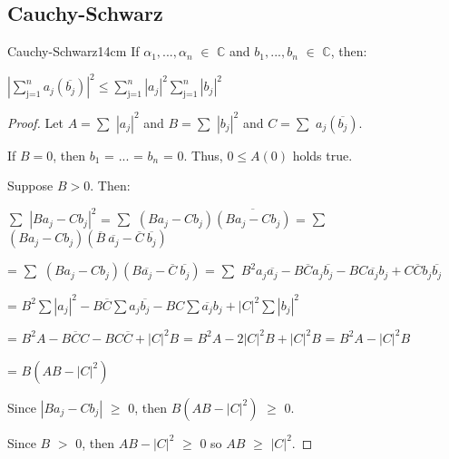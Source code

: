 	\vspace{0.5cm}





\subsection{ Cauchy-Schwarz } 

	\begin{wtheorem}{Cauchy-Schwarz}{14cm}
		If $\alpha_1 , ... , \alpha_n$ $\in$ $\mathbb{C}$ and
		$b_1 , ... , b_n$ $\in$ $\mathbb{C}$, then:

		\hspace{1cm}
		$| \sum_{\text{j=1}}^{n} a_j(\overline{b_j})  |^2 \leq
		\sum_{\text{j=1}}^{n} |a_j|^2 \sum_{\text{j=1}}^{n} |b_j|^2 $
	\end{wtheorem}

	\begin{proof}
		Let $A = \sum$ $|a_j|^2$ and $B = \sum$ $|b_j|^2$ and
		$C = \sum$ $a_j(\overline{b_j})$.

		If $B = 0$, then $b_1$ = ... = $b_n$ = 0. Thus, $0 \leq A(0)$ holds true.

		Suppose $B > 0$. Then:

		\hspace{1cm}
		$\sum$ $|Ba_j - Cb_j|^2$
		= $\sum$ $(Ba_j - Cb_j)\overline{(Ba_j - Cb_j)}$
		= $\sum$ $(Ba_j - Cb_j)(\overline{B} \ \overline{a_j}
		- \overline{C} \ \overline{b_j})$

		\hspace{1cm}
		= $\sum$ $(Ba_j-Cb_j)(B\overline{a_j} - \overline{C} \ \overline{b_j})$
		= $\sum$ $B^2a_j\overline{a_j} - B\overline{C}a_j\overline{b_j}
		- BC\overline{a_j}b_j + C\overline{C}b_j\overline{b_j}$

		\hspace{1cm}
		= $B^2 \sum |a_j|^2 - B\overline{C}\sum a_j\overline{b_j}
		- BC \sum \overline{a_j}b_j+ |C|^2 \sum |b_j|^2$

		\hspace{1cm}
		= $B^2A - B\overline{C}C - BC\overline{C} + |C|^2B$
		= $B^2A - 2|C|^2B + |C|^2B$ = $B^2A -|C|^2B$

		\hspace{1cm}
		= $B(AB - |C|^2)$

		Since $| Ba_j - Cb_j |$ $\geq$ 0, then $B(AB - |C|^2)$ $\geq$ 0.

		Since $B$ $>$ 0, then $AB - |C|^2$ $\geq$ 0 so $AB$ $\geq$ $|C|^2$.
	\end{proof}
	
